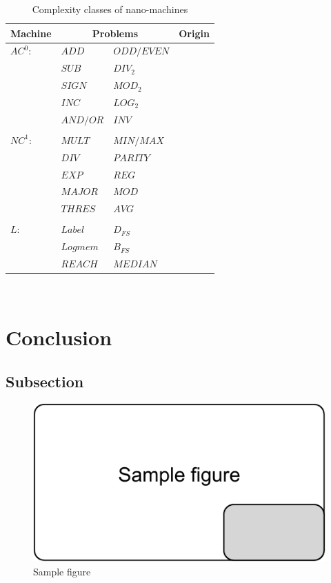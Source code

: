 \documentclass[10pt,sigconf]{acmart}
\begin{document}
\begin{table}
\begin{tabular}{ p{1.5cm}|p{2cm} p{2cm}|p{1.5cm} }
  \hline
  Machine & \multicolumn{2}{c|}{Problems}  & Origin\\
  \hline
  $AC^0$: & $ADD$ & $ODD/EVEN$&  \\
          & $SUB$ & $DIV_{2}$&  \\
          & $SIGN$ & $MOD_{2}$&  \\
          & $INC$ & $LOG_{2}$&  \\
          & $AND/OR$ & $INV$&  \\
          &  & &  \\
  $NC^1$:   & $MULT$ &$MIN/MAX$   & \\
           & $DIV$ & $PARITY$&  \\
           & $EXP$ & $REG$&  \\
           & $MAJOR$ & $MOD$&  \\
           & $THRES$ & $AVG$&  \\
           &  & &  \\
  $L$:      &   $Label$ &$D_{FS}$ &     \\
           & $Log mem$ & $B_{FS}$&  \\
           & $REACH$ & $MEDIAN$&  \\
          
  \hline 
  \end{tabular}\\
  
  \caption{Complexity classes of nano-machines}
  \label{table1}
  \end{table}
  


\section{Conclusion}

\subsection{Subsection}


\begin{figure}[htbp]
  \centering
  \includegraphics[scale=0.5]{sample-figure}
  \caption{Sample figure}
  \label{fig:sample}
\end{figure}





 
\end{document}
